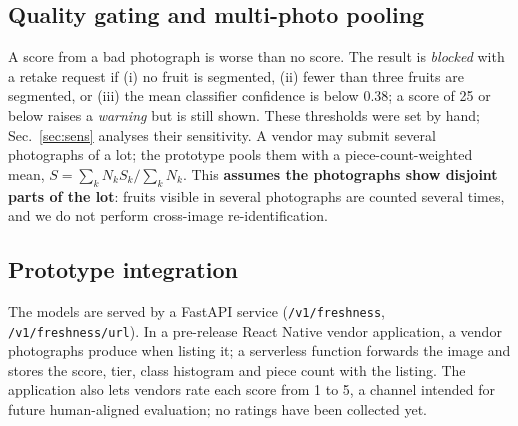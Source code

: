 \documentclass[10pt,twocolumn]{article}
\begin{document}
\begin{table}[t]
\centering\small
\caption{Complete class-to-weight mapping used by the aggregation rule. $\dagger$ marks classes in $\mathcal{C}_{\text{spoil}}$. Tomato classes \emph{old} and \emph{damaged} are named \texttt{overripe} and \texttt{rotten} in the released weights.}
\label{tab:weights}
\end{table}

\subsection{Quality gating and multi-photo pooling}
A score from a bad photograph is worse than no score. The result is \emph{blocked} with a retake request if (i) no fruit is segmented, (ii) fewer than three fruits are segmented, or (iii) the mean classifier confidence is below 0.38; a score of 25 or below raises a \emph{warning} but is still shown. These thresholds were set by hand; Sec.~\ref{sec:sens} analyses their sensitivity. A vendor may submit several photographs of a lot; the prototype pools them with a piece-count-weighted mean, $S = \sum_k N_k S_k / \sum_k N_k$. This \textbf{assumes the photographs show disjoint parts of the lot}: fruits visible in several photographs are counted several times, and we do not perform cross-image re-identification.

\subsection{Prototype integration}
The models are served by a FastAPI service (\texttt{/v1/freshness}, \texttt{/v1/freshness/url}). In a pre-release React Native vendor application, a vendor photographs produce when listing it; a serverless function forwards the image and stores the score, tier, class histogram and piece count with the listing. The application also lets vendors rate each score from 1 to 5, a channel intended for future human-aligned evaluation; no ratings have been collected yet.
\end{document}
